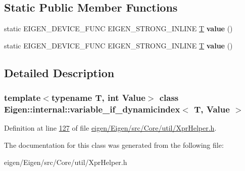 \subsection*{Static Public Member Functions}
\begin{DoxyCompactItemize}
\item 
\mbox{\label{class_eigen_1_1internal_1_1variable__if__dynamicindex_aee3eedba6289a0d91d26048bd36a0310}} 
static E\+I\+G\+E\+N\+\_\+\+D\+E\+V\+I\+C\+E\+\_\+\+F\+U\+NC E\+I\+G\+E\+N\+\_\+\+S\+T\+R\+O\+N\+G\+\_\+\+I\+N\+L\+I\+NE \hyperlink{group___sparse_core___module}{T} {\bfseries value} ()
\item 
\mbox{\label{class_eigen_1_1internal_1_1variable__if__dynamicindex_aee3eedba6289a0d91d26048bd36a0310}} 
static E\+I\+G\+E\+N\+\_\+\+D\+E\+V\+I\+C\+E\+\_\+\+F\+U\+NC E\+I\+G\+E\+N\+\_\+\+S\+T\+R\+O\+N\+G\+\_\+\+I\+N\+L\+I\+NE \hyperlink{group___sparse_core___module}{T} {\bfseries value} ()
\end{DoxyCompactItemize}


\subsection{Detailed Description}
\subsubsection*{template$<$typename T, int Value$>$\newline
class Eigen\+::internal\+::variable\+\_\+if\+\_\+dynamicindex$<$ T, Value $>$}



Definition at line \hyperlink{eigen_2_eigen_2src_2_core_2util_2_xpr_helper_8h_source_l00127}{127} of file \hyperlink{eigen_2_eigen_2src_2_core_2util_2_xpr_helper_8h_source}{eigen/\+Eigen/src/\+Core/util/\+Xpr\+Helper.\+h}.



The documentation for this class was generated from the following file\+:\begin{DoxyCompactItemize}
\item 
eigen/\+Eigen/src/\+Core/util/\+Xpr\+Helper.\+h\end{DoxyCompactItemize}
